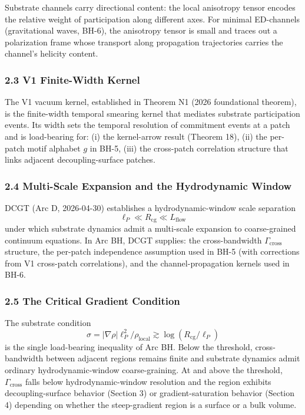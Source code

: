 \documentclass[
  11pt,
  a4paper,
]{article}
\begin{document}
Substrate channels carry directional content: the local anisotropy
tensor encodes the relative weight of participation along different
axes. For minimal ED-channels (gravitational waves, BH-6), the
anisotropy tensor is small and traces out a polarization frame whose
transport along propagation trajectories carries the channel's helicity
content.

\subsubsection{2.3 V1 Finite-Width Kernel}\label{v1-finite-width-kernel}

The V1 vacuum kernel, established in Theorem N1 (2026 foundational
theorem), is the finite-width temporal smearing kernel that mediates
substrate participation events. Its width sets the temporal resolution
of commitment events at a patch and is load-bearing for: (i) the
kernel-arrow result (Theorem 18), (ii) the per-patch motif alphabet
\(g\) in BH-5, (iii) the cross-patch correlation structure that links
adjacent decoupling-surface patches.

\subsubsection{2.4 Multi-Scale Expansion and the Hydrodynamic
Window}\label{multi-scale-expansion-and-the-hydrodynamic-window}

DCGT (Arc D, 2026-04-30) establishes a hydrodynamic-window scale
separation \[
\ell_P \ll R_\mathrm{cg} \ll L_\mathrm{flow}
\] under which substrate dynamics admit a multi-scale expansion to
coarse-grained continuum equations. In Arc BH, DCGT supplies: the
cross-bandwidth \(\Gamma_\mathrm{cross}\) structure, the per-patch
independence assumption used in BH-5 (with corrections from V1
cross-patch correlations), and the channel-propagation kernels used in
BH-6.

\subsubsection{2.5 The Critical Gradient
Condition}\label{the-critical-gradient-condition}

The substrate condition \[
\sigma = |\nabla\rho|\ell_P^2/\rho_\mathrm{local} \gtrsim \log(R_\mathrm{cg}/\ell_P)
\] is the single load-bearing inequality of Arc BH. Below the threshold,
cross-bandwidth between adjacent regions remains finite and substrate
dynamics admit ordinary hydrodynamic-window coarse-graining. At and
above the threshold, \(\Gamma_\mathrm{cross}\) falls below
hydrodynamic-window resolution and the region exhibits
decoupling-surface behavior (Section 3) or gradient-saturation behavior
(Section 4) depending on whether the steep-gradient region is a surface
or a bulk volume.
\end{document}
